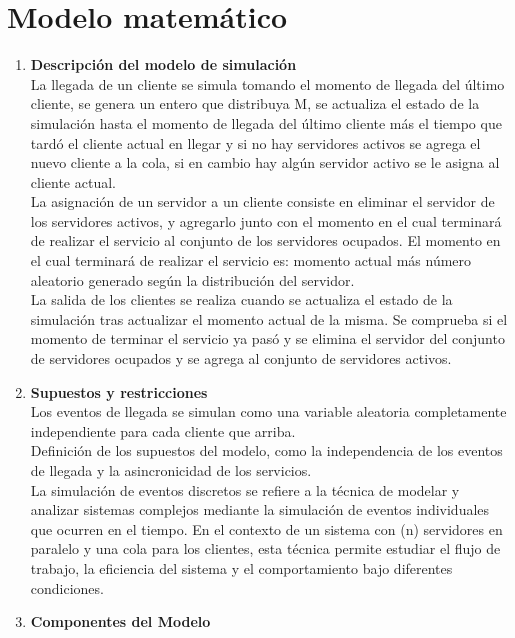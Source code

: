 \documentclass[article]{amsart}
\begin{document}
\newpage
\section{Modelo matem\'atico}

\begin{enumerate}
\item \textbf{Descripción del modelo de simulación}\\
    La llegada de un cliente se simula tomando el momento de llegada del \'ultimo cliente, se genera un entero que distribuya M, se actualiza el estado de la simulaci\'on hasta el momento de llegada del \'ultimo cliente m\'as el tiempo que tard\'o el cliente actual en llegar y si no hay servidores activos se agrega el nuevo cliente a la cola, si en cambio hay alg\'un servidor activo se le asigna al cliente actual.\\
    La asignaci\'on de un servidor a un cliente consiste en eliminar el servidor de los servidores activos, y agregarlo junto con el momento en el cual terminar\'a de realizar el servicio al conjunto de los servidores ocupados. El momento en el cual terminar\'a de realizar el servicio es: momento actual m\'as n\'umero aleatorio generado seg\'un la distribuci\'on del servidor.\\
    La salida de los clientes se realiza cuando se actualiza el estado de la simulaci\'on tras actualizar el momento actual de la misma. Se comprueba si el momento de terminar el servicio ya pas\'o y se elimina el servidor del conjunto de servidores ocupados y se agrega al conjunto de servidores activos.\\

\item \textbf{Supuestos y restricciones}\\
Los eventos de llegada se simulan como una variable aleatoria completamente independiente para cada cliente que arriba.\\
Definición de los supuestos del modelo, como la independencia de los eventos de llegada y la asincronicidad de los servicios.\\

La simulación de eventos discretos se refiere a la técnica de modelar y analizar sistemas complejos mediante la simulación de eventos individuales que ocurren en el tiempo. En el contexto de un sistema con (n) servidores en paralelo y una cola para los clientes, esta técnica permite estudiar el flujo de trabajo, la eficiencia del sistema y el comportamiento bajo diferentes condiciones.\\
\item \textbf{Componentes del Modelo}\\
\begin{itemize}


\end{itemize}
\end{enumerate}
\end{document}
